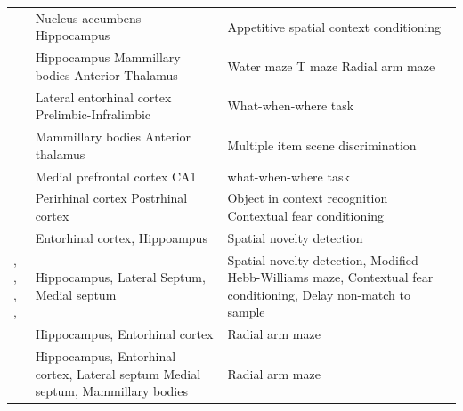\documentclass[doc, longtable]{apa6}
\begin{document}
\begin{landscape}
\begin{longtable}{p{8cm}p{5cm}p{8cm}}
\cite{ito2008functional} & Nucleus accumbens \newline Hippocampus & Appetitive spatial context conditioning \\[20pt]
\cite{vann2011selective} & Hippocampus \newline Mammillary bodies \newline Anterior Thalamus & Water maze \newline T maze \newline Radial arm maze\\[20pt]
\cite{chao2016medial} & Lateral entorhinal cortex \newline Prelimbic-Infralimbic & What-when-where task\\[20pt]
\cite{nelson2016importance} & Mammillary bodies \newline Anterior thalamus & Multiple item scene discrimination\\[20pt]
\cite{chao2017interaction} & Medial prefrontal cortex \newline CA1 & what-when-where task\\[20pt]
\cite{heimer2017disconnection} & Perirhinal cortex \newline Postrhinal cortex & Object in context recognition \newline Contextual fear conditioning \\[20pt]
\cite{OKADA2010295} & Entorhinal cortex, \newline Hippoampus & Spatial novelty detection\\[20pt]
\cite{HUNSAKER2009192}, \newline \cite{HUNSAKER2007127}, \newline \cite{hunsaker2009behavioral}, \newline \cite{HIPO:HIPO20429}, \newline \cite{HIPO:HIPO20288} & Hippocampus, \newline Lateral Septum, \newline Medial septum & Spatial novelty detection, \newline Modified Hebb-Williams maze, \newline Contextual fear conditioning, \newline Delay non-match to sample \\[20pt]
\cite{OLTON1982241} & Hippocampus, \newline Entorhinal cortex & Radial arm maze\\[20pt]
\cite{OLTON1978295} & Hippocampus, \newline Entorhinal cortex, \newline Lateral septum \newline Medial septum, \newline Mammillary bodies & Radial arm maze \\[20pt]

\end{longtable}
\end{landscape}
\end{document}
